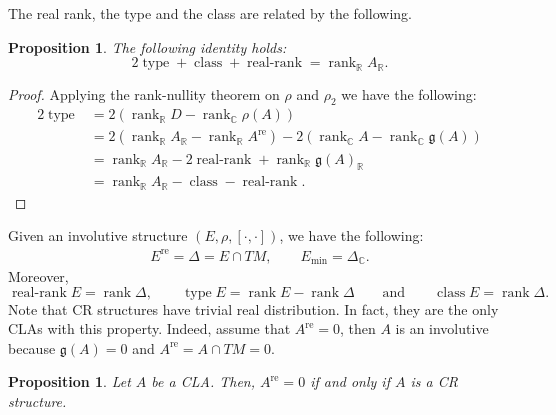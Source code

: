 \documentclass[pdftex]{sigma}
\numberwithin{equation}{section}
\newtheorem{Proposition}[Theorem]{Proposition}
 { \theoremstyle{definition}
\newtheorem{Definition}[Theorem]{Definition}
\newtheorem{Note}[Theorem]{Note}
\newtheorem{Example}[Theorem]{Example}
\newtheorem{Examples}[Theorem]{Examples}
\newtheorem{Remark}[Theorem]{Remark} }
\newcommand{\R}{{\mathbb{R}}}
\newcommand{\C}{{\mathbb{C}}}
\newcommand{\g}{\mathfrak{g}}
\DeclareMathOperator{\type}{type}
\DeclareMathOperator{\rk}{rank}
\DeclareMathOperator{\real}{re}
\DeclareMathOperator{\rerk}{real-rank}
\DeclareMathOperator{\class}{class}
\begin{document}
The real rank, the type and the class are related by the following.
\begin{Proposition} The following identity holds:
  \[
  2\type+\class+\rerk =\rk_{\R}A_{\R}.
  \]
  \end{Proposition}
  \begin{proof}
  Applying the rank-nullity theorem on $\rho$ and $\rho_2$ we have the following:
  \begin{align*}
    2\type&=2(\rk_{\R}D-\rk_{\C}\rho(A))\\
       &=2(\rk_{\R}A_{\R}-\rk_{\R}A^{\real})-2(\rk_{\C}A-\rk_{\C} \g(A))\\
       &=\rk_{\R}A_{\R}-2\rerk+\rk_{\R}\g(A)_{\R}\\
       &=\rk_{\R}A_{\R}-\class-\rerk.
\tag*{\qed}
\end{align*}
\renewcommand{\qed}{}
\end{proof}

  \begin{Example} \label{examples1-1}
 Given an involutive structure $(E,\rho, [\cdot,\cdot])$, we have the following:
\begin{align*}
  E^{\real} =\Delta=E\cap TM,\qquad
  E_{\min} =\Delta_{\C}.
\end{align*}
Moreover,
\[\rerk E=\rk \Delta,\qquad \type E=\rk E-\rk\Delta\qquad\text{and}\qquad\class E=\rk \Delta.\]
 Note that CR structures have trivial real distribution. In fact, they are the only CLAs with this property. Indeed, assume that $A^{\real}=0$, then $A$ is an involutive because $\g(A)=0$ and $A^{\real}=A\cap TM=0$.
 \end{Example}
\begin{Proposition}
  Let $A$ be a CLA. Then, $A^{\real}=0$ if and only if $A$ is a CR structure.
\end{Proposition}
\end{document}
